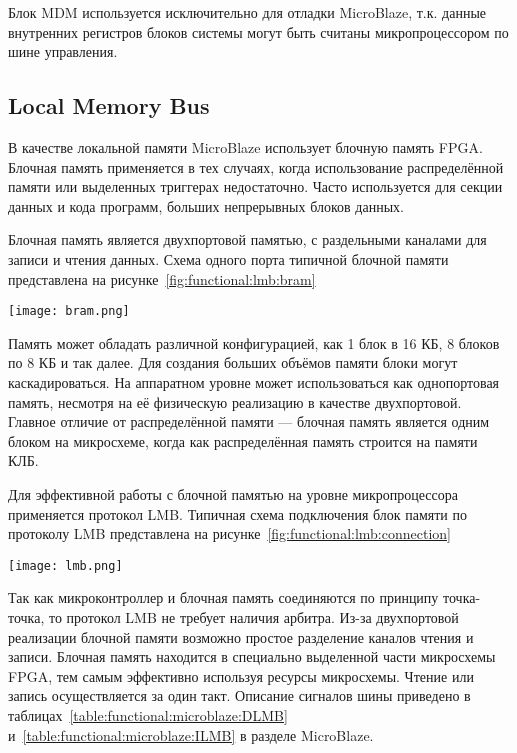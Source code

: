 Блок MDM используется исключительно для отладки MicroBlaze, т.к. данные внутренних регистров
блоков системы могут быть считаны микропроцессором по шине управления.

\subsection{Local Memory Bus}
\label{sec:functional:lmb}

В качестве локальной памяти MicroBlaze использует блочную память FPGA.
Блочная память применяется в тех случаях, когда использование распределённой памяти
или выделенных триггерах недостаточно. Часто используется для секции данных и кода программ,
больших непрерывных блоков данных.

Блочная память является двухпортовой памятью, с раздельными каналами для записи и чтения
данных. Схема одного порта типичной блочной памяти представлена
на рисунке~\ref{fig:functional:lmb:bram}

\begin{center}
  \centering
  \texttt{[image: bram.png]}
  \label{fig:functional:lmb:bram}
\end{center}

Память может обладать различной конфигурацией, как 1 блок в 16 КБ, 8 блоков по 8 КБ и так далее.
Для создания больших объёмов памяти блоки могут каскадироваться. На аппаратном уровне может использоваться
как однопортовая память, несмотря на её физическую реализацию в качестве двухпортовой. Главное отличие от
распределённой памяти --- блочная память является одним блоком на микросхеме, когда как распределённая
память строится на памяти КЛБ.

Для эффективной работы с блочной памятью на уровне микропроцессора применяется протокол LMB.
Типичная схема подключения блок памяти по протоколу LMB представлена на рисунке~\ref{fig:functional:lmb:connection}

\begin{center}
  \centering
  \texttt{[image: lmb.png]}
  \label{fig:functional:lmb:connection}
\end{center}

Так как микроконтроллер и блочная память соединяются по принципу точка-точка, то протокол LMB
не требует наличия арбитра. Из-за двухпортовой реализации блочной памяти возможно простое разделение
каналов чтения и записи. Блочная память находится в специально выделенной части микросхемы FPGA,
тем самым эффективно используя ресурсы микросхемы. Чтение или запись осуществляется за один такт.
Описание сигналов шины приведено в таблицах~\ref{table:functional:microblaze:DLMB} и~\ref{table:functional:microblaze:ILMB} в
разделе MicroBlaze.

